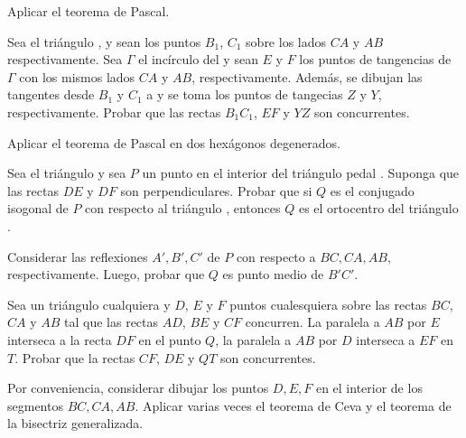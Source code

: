 \begin{hint}
    Aplicar el teorema de Pascal.
\end{hint}

\begin{section-problem}
    Sea el triángulo , y sean los puntos $B_1$, $C_1$ sobre los lados $CA$ y $AB$ respectivamente.
    Sea $\Gamma$ el incírculo del  y sean $E$ y $F$ los puntos de tangencias de $\Gamma$ con los mismos lados $CA$ y $AB$, respectivamente.
    Además, se dibujan las tangentes desde $B_1$ y $C_1$ a  y se toma los puntos de tangecias $Z$ y $Y$, respectivamente.
    Probar que las rectas $B_1 C_1$, $EF$ y $YZ$ son concurrentes.
\end{section-problem}

\begin{hint}
    Aplicar el teorema de Pascal en dos hexágonos degenerados.
\end{hint}


\begin{section-problem}
    Sea el triángulo  y sea $P$ un punto en el interior del triángulo pedal .
    Suponga que las rectas $DE$ y $DF$ son perpendiculares.
    Probar que si $Q$ es el conjugado isogonal de $P$ con respecto al triángulo , entonces $Q$ es el ortocentro del triángulo .
\end{section-problem}

\begin{hint}
    Considerar las reflexiones $A', B', C'$ de $P$ con respecto a $BC, CA, AB$, respectivamente.
    Luego, probar que $Q$ es punto medio de $B'C'$.
\end{hint}


\begin{section-problem}
    Sea  un triángulo cualquiera y $D$, $E$ y $F$ puntos cualesquiera sobre las rectas $BC$, $CA$ y $AB$ tal que las rectas $AD$, $BE$ y $CF$ concurren.
    La paralela a $AB$ por $E$ interseca a la recta $DF$ en el punto $Q$, la paralela a $AB$ por $D$ interseca a $EF$ en $T$.
    Probar que la rectas $CF$, $DE$ y $QT$ son concurrentes.
\end{section-problem}

\begin{hint}
    Por conveniencia, considerar dibujar los puntos $D, E, F$ en el interior de los segmentos $BC, CA, AB$.
    Aplicar varias veces el teorema de Ceva y el teorema de la bisectriz generalizada.
\end{hint}


